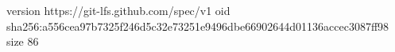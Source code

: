 version https://git-lfs.github.com/spec/v1
oid sha256:a556cea97b7325f246d5c32e73251e9496dbe66902644d01136accec3087ff98
size 86
